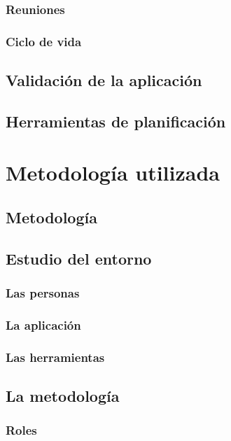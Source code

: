 \documentclass{iccmemoria}
\begin{document}
		\subsection{Reuniones}
		
		\subsection{Ciclo de vida}
		

	\section{Validación de la aplicación}
		

	\section{Herramientas de planificación}

\chapter{Metodología utilizada}
	\section{Metodología}
	

	\section{Estudio del entorno}
		\subsection{Las personas}
		\subsection{La aplicación}
		\subsection{Las herramientas}
	
	\section{La metodología}
		\subsection{Roles}
\end{document}
